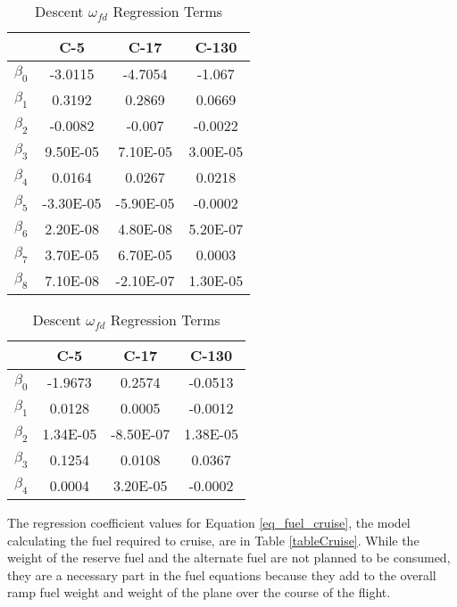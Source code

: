 %
\begin{table}[h!]
\begin{minipage}{.5\linewidth}
\centering
\caption{Climb $\omega_{fc}$ Regression Terms \cite{Reiman2014}}
\label{tableClimb}
\begin{tabular}{@{}lccc@{}}
\hline
\hline
& C-5  & C-17 & C-130\\\hline
$\beta_0$ & -3.0115 & -4.7054 & -1.067 \\
$\beta_1$ & 0.3192 & 0.2869 & 0.0669 \\
$\beta_2$ & -0.0082 & -0.007 & -0.0022 \\
$\beta_3$ & 9.50E-05 & 7.10E-05 & 3.00E-05 \\
$\beta_4$ & 0.0164 & 0.0267 & 0.0218 \\
$\beta_5$ & -3.30E-05 & -5.90E-05 & -0.0002 \\
$\beta_6$ & 2.20E-08 & 4.80E-08 & 5.20E-07 \\
$\beta_7$ & 3.70E-05 & 6.70E-05 & 0.0003 \\
$\beta_8$ & 7.10E-08 & -2.10E-07 & 1.30E-05\\ \hline
\end{tabular}
\end{minipage}
\begin{minipage}{.5\linewidth}
\centering
\caption{Descent $\omega_{fd}$ Regression Terms \cite{Reiman2014}}
\label{tableDescent}
\begin{tabular}{@{}lccc@{}}
\hline
\hline
& C-5  & C-17 & C-130\\\hline
$\beta_0$ & -1.9673 & 0.2574 & -0.0513 \\
$\beta_1$ & 0.0128 & 0.0005 & -0.0012 \\
$\beta_2$ & 1.34E-05 & -8.50E-07 & 1.38E-05 \\
$\beta_3$ & 0.1254 & 0.0108 & 0.0367 \\
$\beta_4$ & 0.0004 & 3.20E-05 & -0.0002\\\hline
\end{tabular}
\end{minipage}
\end{table}

\pagebreak The regression coefficient values for Equation \ref{eq_fuel_cruise}, the model calculating the fuel required to cruise, are in Table \ref{tableCruise}. While the weight of the reserve fuel and the alternate fuel are not planned to be consumed, they are a necessary part in the fuel equations because they add to the overall ramp fuel weight and weight of the plane over the course of the flight.

